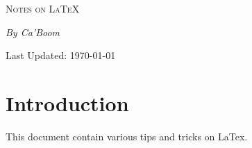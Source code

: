 \documentclass[a4paper,12pt]{article}
\begin{document}
\begin{titlepage}
    \centering
    \vspace*{3cm}  %
    {\scshape \Huge Notes on \LaTeX \par}
    \vspace{6cm}
    {\LARGE \itshape By Ca'Boom \par}
    \vspace{6cm}
    {\Large Last Updated: \today \par}
    \vfill

\end{titlepage}

\section{Introduction}

This document contain various tips and tricks on LaTex.
\end{document}
